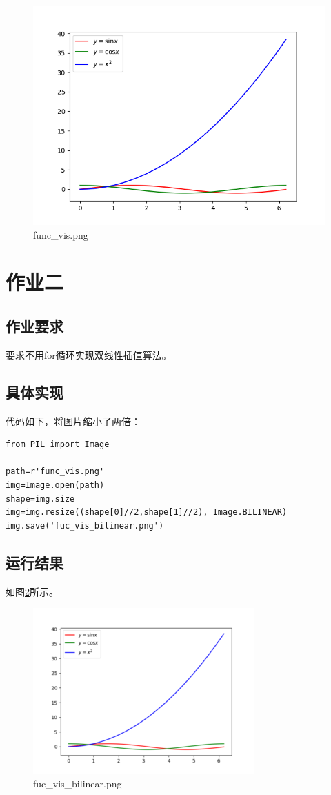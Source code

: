 \documentclass{article}
\begin{document}
\begin{figure}[htbp]
	\centering
	\includegraphics[width=\linewidth]{fig/func_vis.png}
	\caption{func\_vis.png}
	\label{fig1}
\end{figure}

\section{作业二}

\subsection{作业要求}

要求不用for循环实现双线性插值算法。

\subsection{具体实现}

代码如下，将图片缩小了两倍：

\begin{lstlisting}[title={inter\_linear.py}]
from PIL import Image

path=r'func_vis.png'
img=Image.open(path)
shape=img.size
img=img.resize((shape[0]//2,shape[1]//2), Image.BILINEAR)
img.save('fuc_vis_bilinear.png')
\end{lstlisting}

\subsection{运行结果}

如图\ref{fig2}所示。

\begin{figure}[htbp]
	\centering
	\includegraphics[width=0.5\linewidth]{fig/fuc_vis_bilinear.png}
	\caption{fuc\_vis\_bilinear.png}
	\label{fig2}
\end{figure}

\end{document}
